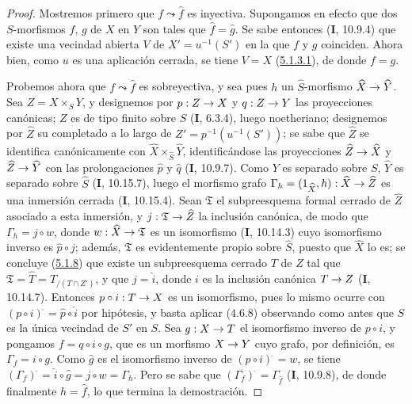 \documentclass[10pt,oneside,openany]{book}
\theoremstyle{egaenv}\newtheorem*{env}{---}
\theoremstyle{egastatement}
\theoremstyle{egadescription}
\newcommand{\oldpage}[2][]{\marginnote{\normalfont\scriptsize\textbf{#1}\,|\,#2}\ignorespaces}
\renewcommand{\to}{\mathchoice{\longrightarrow}{\rightarrow}{\rightarrow}{\rightarrow}}
\begin{document}
\begin{proof}
Mostremos primero que $f\leadsto\widehat f$ es inyectiva. Supongamos en efecto que dos
$S$-morfismos $f$, $g$ de $X$ en $Y$ son tales que $\widehat f=\widehat g$.
Se sabe entonces (\textbf{I}, 10.9.4) que existe una vecindad abierta $V$ de
$X'=u^{-1}(S')$ en la que $f$ y $g$ coinciden. Ahora bien, como $u$ es una aplicación
cerrada, se tiene $V=X$ (\hyperref[III.5.1.3.1-fr]{5.1.3.1}), de donde $f=g$.

Probemos ahora que $f\leadsto\widehat f$ es sobreyectiva, y sea pues $h$ un
$\widehat S$-morfismo $\widehat X\to\widehat Y$. Sea $Z=X\times_S Y$, y
designemos por $p:Z\to X$ y $q:Z\to Y$ las proyecciones canónicas; $Z$ es de
tipo finito sobre $S$ (\textbf{I}, 6.3.4), luego noetheriano; designemos por $\widehat Z$ su
completado a lo largo de $Z'=p^{-1}(u^{-1}(S'))$; se sabe que $\widehat Z$ se identifica
canónicamente con $\widehat X\times_{\widehat S}\widehat Y$, identificándose las proyecciones
$\widehat Z\to\widehat X$ y $\widehat Z\to\widehat Y$ con las
prolongaciones $\widehat p$ y $\widehat q$ (\textbf{I}, 10.9.7). Como $Y$ es separado sobre
$S$, $\widehat Y$ es separado sobre $\widehat S$ (\textbf{I}, 10.15.7), luego el morfismo
grafo
$\Gamma_h=(1_{\widehat X},h):\widehat X\to\widehat Z$
es una inmersión cerrada (\textbf{I}, 10.15.4). Sean $\mathfrak T$ el subpreesquema
formal cerrado de $\widehat Z$ asociado a esta inmersión, y
$j:\mathfrak T\to\widehat Z$ la inclusión canónica, de modo que
$\Gamma_h=j\circ w$, donde $w:\widehat X\to\mathfrak T$ es un isomorfismo
(\textbf{I}, 10.14.3) cuyo isomorfismo inverso es $\widehat p\circ j$; además,
$\mathfrak T$ es evidentemente propio sobre $\widehat S$, puesto que $\widehat X$ lo es;
se concluye (\hyperref[III.5.1.8-fr]{5.1.8}) que existe un subpreesquema
cerrado $T$ de $Z$ tal que
$\mathfrak T=\widehat T=T_{/(T\cap Z')}$, y que $j=\widehat i$, donde $i$ es
la inclusión canónica $T\to Z$ (\textbf{I}, 10.14.7). Entonces $p\circ i:T\to X$ es un
isomorfismo, pues lo mismo ocurre con
$(p\circ i)^{\widehat{\,}}=\widehat p\circ\widehat i$ por hipótesis, y basta
aplicar
\oldpage[III]{157}
(4.6.8) observando como antes que $S$ es la única vecindad de $S'$ en $S$.
Sea $g:X\to T$ el isomorfismo inverso de $p\circ i$, y pongamos
$f=q\circ i\circ g$, que es un morfismo $X\to Y$ cuyo grafo, por definición, es
$\Gamma_f=i\circ g$. Como $\widehat g$ es el isomorfismo inverso de
$(p\circ i)^{\widehat{\,}}=w$, se tiene
$(\Gamma_f)^{\widehat{\,}}=\widehat i\circ\widehat g=j\circ w=\Gamma_h$.
Pero se sabe que $(\Gamma_f)^{\widehat{\,}}=\Gamma_{\widehat f}$ (\textbf{I}, 10.9.8), de donde
finalmente $h=\widehat f$, lo que termina la demostración.
\end{proof}
\end{document}
